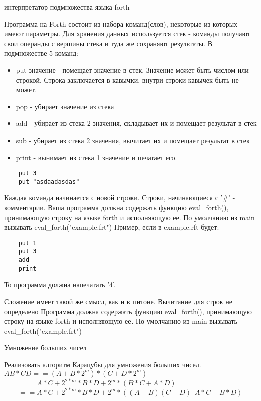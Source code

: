 \documentclass{article}
\begin{document}
\begin{center} интерпретатор подмножества языка forth \end{center}
      Программа на Forth состоит из набора команд(слов),
      некоторые из которых имеют параметры. Для хранения данных используется стек -
      команды получают свои операнды с вершины стека и туда же сохраняют результаты.
      В  подмножестве 5 команд:
\begin{itemize}
    \item put значение - помещает значение в стек. Значение может
          быть числом или строкой. Строка заключается в кавычки, внутри
          строки кавычек быть не может.
    \item pop - убирает значение из стека
    \item add - убирает из стека 2 значения, складывает их и помещает результат в стек
    \item sub - убирает из стека 2 значения, вычитает их и помещает результат в стек
    \item print - вынимает из стека 1 значение и печатает его.
\end{itemize}


\begin{lstlisting}
    put 3
    put "asdaadasdas"
\end{lstlisting}

    Каждая команда начинается с новой строки. Строки, начинающиеся с '\#' - комментарии.
    Ваша программа должна содержать функцию eval\_forth(), принимающую строку на языке
    forth и исполняющую ее. По умолчанию из main вызывать eval\_forth("example.frt")
    Пример, если в example.rft будет:

\begin{lstlisting}
    put 1
    put 3
    add
    print
\end{lstlisting}

    То программа должна напечатать '4'. 

    Сложение имеет такой же смысл, как и в питоне. Вычитание для строк не определено
    Программа должна содержать функцию eval\_forth(), принимающую строку на языке forth и исполняющую ее. 
    По умолчанию из main вызывать eval\_forth("example.frt")
\newpage

\begin{center} Умножение больших чисел \end{center}
Реализовать алгоритм 
\href{http://ru.wikipedia.org/wiki/%D0%A3%D0%BC%D0%BD%D0%BE%D0%B6%D0%B5%D0%BD%D0%B8%D0%B5_%D0%9A%D0%B0%D1%80%D0%B0%D1%86%D1%83%D0%B1%D1%8B}
{Карацубы} 
для умножения больших чисел. \\
$AB * CD == (A + B * 2^m) * (C + D * 2^m)$ \\ 
$ \qquad == A * C + 2^{2*m} * B * D + 2^m * (B * C + A * D)$ \\
$ \qquad == A * C + 2^{2*m} * B * D + 2^m * ((A + B)(C + D) – A * C - B * D) $
\newpage
\end{document}
